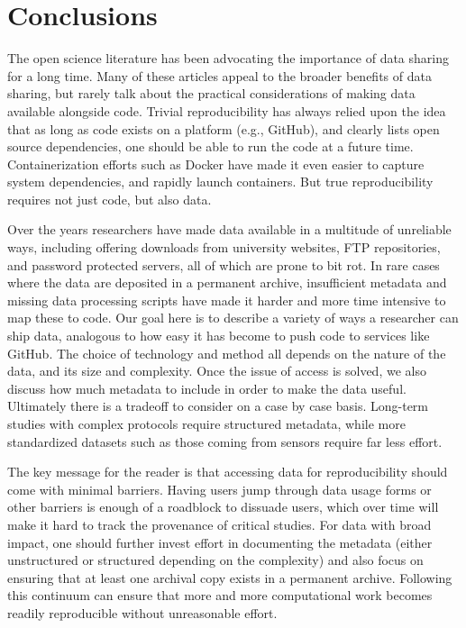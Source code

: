 \documentclass[
]{article}
\begin{document}
\hypertarget{conclusions}{%
\section{Conclusions}\label{conclusions}}

The open science literature has been advocating the importance of data sharing for a long time. Many of these articles appeal to the broader benefits of data sharing, but rarely talk about the practical considerations of making data available alongside code. Trivial reproducibility has always relied upon the idea that as long as code exists on a platform (e.g., GitHub), and clearly lists open source dependencies, one should be able to run the code at a future time. Containerization efforts such as Docker have made it even easier to capture system dependencies, and rapidly launch containers. But true reproducibility requires not just code, but also data.

Over the years researchers have made data available in a multitude of unreliable ways, including offering downloads from university websites, FTP repositories, and password protected servers, all of which are prone to bit rot. In rare cases where the data are deposited in a permanent archive, insufficient metadata and missing data processing scripts have made it harder and more time intensive to map these to code. Our goal here is to describe a variety of ways a researcher can ship data, analogous to how easy it has become to push code to services like GitHub. The choice of technology and method all depends on the nature of the data, and its size and complexity. Once the issue of access is solved, we also discuss how much metadata to include in order to make the data useful. Ultimately there is a tradeoff to consider on a case by case basis. Long-term studies with complex protocols require structured metadata, while more standardized datasets such as those coming from sensors require far less effort.

The key message for the reader is that accessing data for reproducibility should come with minimal barriers. Having users jump through data usage forms or other barriers is enough of a roadblock to dissuade users, which over time will make it hard to track the provenance of critical studies. For data with broad impact, one should further invest effort in documenting the metadata (either unstructured or structured depending on the complexity) and also focus on ensuring that at least one archival copy exists in a permanent archive. Following this continuum can ensure that more and more computational work becomes readily reproducible without unreasonable effort.
\end{document}
